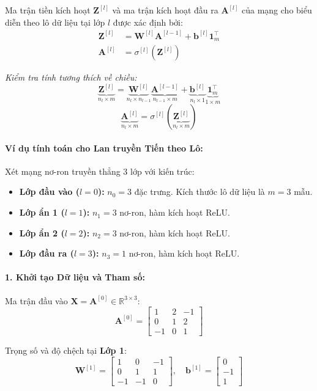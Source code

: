 Ma trận tiền kích hoạt $\mathbf{Z}^{[l]}$ và ma trận kích hoạt đầu ra $\mathbf{A}^{[l]}$ của mạng cho biểu diễn theo lô dữ liệu tại lớp $l$ được xác định bởi:
\[
\begin{aligned}
\mathbf{Z}^{[l]} &= \mathbf{W}^{[l]}\mathbf{A}^{[l-1]} + \mathbf{b}^{[l]}\mathbf{1}_m^{\top} \\[6pt]
\mathbf{A}^{[l]} &= \sigma^{[l]}\left( \mathbf{Z}^{[l]} \right)
\end{aligned}
\]

\textit{Kiểm tra tính tương thích về chiều:}
\[
\underbrace{\mathbf{Z}^{[l]}}_{n_l \times m} = \underbrace{\mathbf{W}^{[l]}}_{n_l \times n_{l-1}} \underbrace{\mathbf{A}^{[l-1]}}_{n_{l-1} \times m} + \underbrace{\mathbf{b}^{[l]}}_{n_l \times 1} \underbrace{\mathbf{1}_m^{\top}}_{1 \times m}
\]
\[
\underbrace{\mathbf{A}^{[l]}}_{n_l \times m} = \sigma^{[l]}\left( \underbrace{\mathbf{Z}^{[l]}}_{n_l \times m} \right)
\]

\paragraph{Ví dụ tính toán cho Lan truyền Tiến theo Lô:}
Xét mạng nơ-ron truyền thẳng 3 lớp với kiến trúc:
\begin{itemize}
    \item \textbf{Lớp đầu vào ($l=0$):} $n_0 = 3$ đặc trưng. Kích thước lô dữ liệu là $m = 3$ mẫu.
    \item \textbf{Lớp ẩn 1 ($l=1$):} $n_1 = 3$ nơ-ron, hàm kích hoạt ReLU.
    \item \textbf{Lớp ẩn 2 ($l=2$):} $n_2 = 3$ nơ-ron, hàm kích hoạt ReLU.
    \item \textbf{Lớp đầu ra ($l=3$):} $n_3 = 1$ nơ-ron, hàm kích hoạt ReLU.
\end{itemize}


\paragraph{1. Khởi tạo Dữ liệu và Tham số:}
Ma trận đầu vào $\mathbf{X} = \mathbf{A}^{[0]} \in \mathbb{R}^{3 \times 3}$:
\begin{equation}
\mathbf{A}^{[0]} = 
\begin{bmatrix}
    1 & 2 & -1 \\
    0 & 1 & 2 \\
    -1 & 0 & 1
\end{bmatrix}
\end{equation}

Trọng số và độ chệch tại \textbf{Lớp 1}:
\begin{equation}
\mathbf{W}^{[1]} = 
\begin{bmatrix}
    1 & 0 & -1 \\
    0 & 1 & 1 \\
    -1 & -1 & 0
\end{bmatrix}, 
\quad
\mathbf{b}^{[1]} = 
\begin{bmatrix}
    0 \\ -1 \\ 1
\end{bmatrix}
\end{equation}

